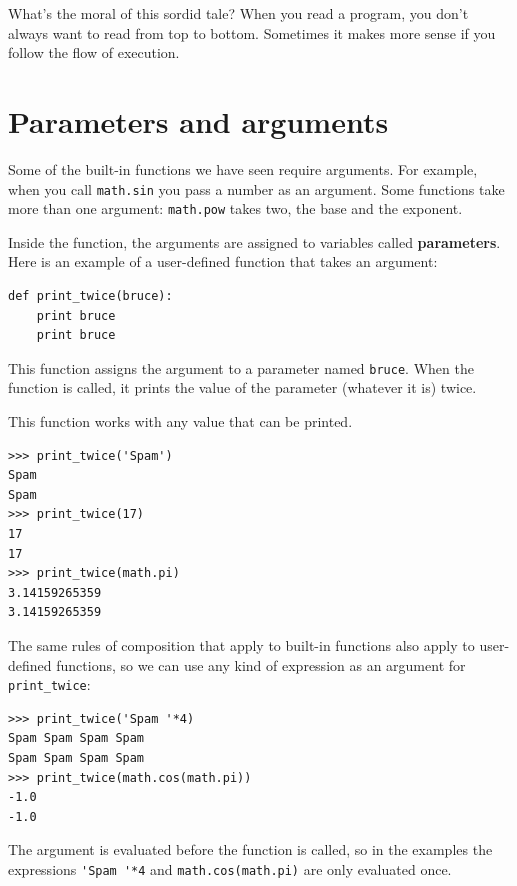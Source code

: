\documentclass[10pt]{book}
\begin{document}
What's the moral of this sordid tale?  When you read a program, you
don't always want to read from top to bottom.  Sometimes it makes
more sense if you follow the flow of execution.


\section{Parameters and arguments}
\label{parameters}

Some of the built-in functions we have seen require arguments.  For
example, when you call {\tt math.sin} you pass a number
as an argument.  Some functions take more than one argument:
{\tt math.pow} takes two, the base and the exponent.

Inside the function, the arguments are assigned to
variables called {\bf parameters}.  Here is an example of a
user-defined function that takes an argument:


\beforeverb
\begin{verbatim}
def print_twice(bruce):
    print bruce
    print bruce
\end{verbatim}
\afterverb
%
This function assigns the argument to a parameter
named {\tt bruce}.  When the function is called, it prints the value of
the parameter (whatever it is) twice.

This function works with any value that can be printed.

\beforeverb
\begin{verbatim}
>>> print_twice('Spam')
Spam
Spam
>>> print_twice(17)
17
17
>>> print_twice(math.pi)
3.14159265359
3.14159265359
\end{verbatim}
\afterverb
%
The same rules of composition that apply to built-in functions also
apply to user-defined functions, so we can use any kind of expression
as an argument for \verb"print_twice":


\beforeverb
\begin{verbatim}
>>> print_twice('Spam '*4)
Spam Spam Spam Spam
Spam Spam Spam Spam
>>> print_twice(math.cos(math.pi))
-1.0
-1.0
\end{verbatim}
\afterverb
%
The argument is evaluated before the function is called, so
in the examples the expressions \verb"'Spam '*4" and
{\tt math.cos(math.pi)} are only evaluated once.

\end{document}
